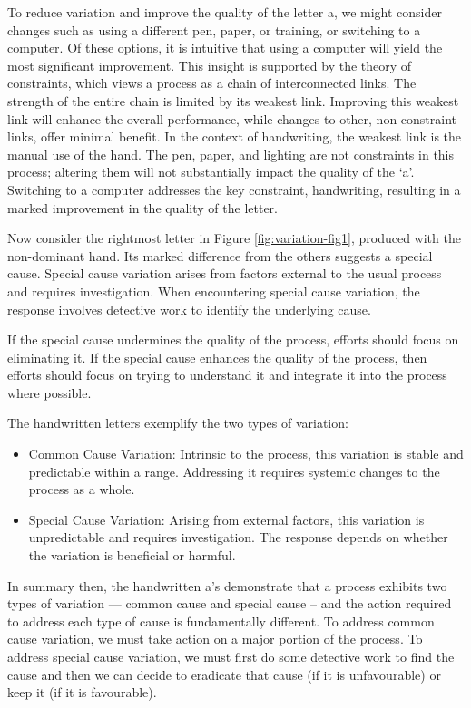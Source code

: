 \documentclass[
]{book}
\begin{document}
To reduce variation and improve the quality of the letter a, we might consider changes such as using a different pen, paper, or training, or switching to a computer. Of these options, it is intuitive that using a computer will yield the most significant improvement. This insight is supported by the theory of constraints, which views a process as a chain of interconnected links. The strength of the entire chain is limited by its weakest link. Improving this weakest link will enhance the overall performance, while changes to other, non-constraint links, offer minimal benefit. In the context of handwriting, the weakest link is the manual use of the hand. The pen, paper, and lighting are not constraints in this process; altering them will not substantially impact the quality of the `a'. Switching to a computer addresses the key constraint, handwriting, resulting in a marked improvement in the quality of the letter.

Now consider the rightmost letter in Figure \ref{fig:variation-fig1}, produced with the non-dominant hand. Its marked difference from the others suggests a special cause. Special cause variation arises from factors external to the usual process and requires investigation. When encountering special cause variation, the response involves detective work to identify the underlying cause.

If the special cause undermines the quality of the process, efforts should focus on eliminating it.
If the special cause enhances the quality of the process, then efforts should focus on trying to understand it and integrate it into the process where possible.

The handwritten letters exemplify the two types of variation:

\begin{itemize}
\item
  Common Cause Variation: Intrinsic to the process, this variation is stable and predictable within a range. Addressing it requires systemic changes to the process as a whole.
\item
  Special Cause Variation: Arising from external factors, this variation is unpredictable and requires investigation. The response depends on whether the variation is beneficial or harmful.
\end{itemize}

In summary then, the handwritten a's demonstrate that a process exhibits two types of variation --- common cause and special cause -- and the action required to address each type of cause is fundamentally different. To address common cause variation, we must take action on a major portion of the process. To address special cause variation, we must first do some detective work to find the cause and then we can decide to eradicate that cause (if it is unfavourable) or keep it (if it is favourable).
\end{document}
